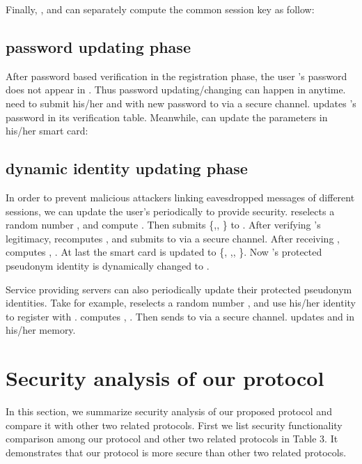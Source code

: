 \documentclass[preprint,12pt]{elsarticle}
\begin{document}
Finally, ,  and  can separately compute the common session key  as follow:


\subsection{password updating phase}
After password based verification in the registration phase, the user 's password   does not appear in . Thus password updating/changing can happen in anytime.  need to submit his/her  and  with new password  to  via a secure channel.  updates 's password in its verification table. Meanwhile,  can update the parameters in his/her smart card:


\subsection{dynamic identity updating phase}
In order to prevent malicious attackers linking eavesdropped messages of different sessions, we can update the user's  periodically to provide security.  reselects a random number , and compute . Then  submits \{,, \} to . After verifying 's legitimacy,  recomputes ,  and submits  to  via a secure channel. After receiving ,  computes , . At last the smart card is updated to \{, ,, \}. Now 's protected pseudonym identity  is dynamically changed to .

Service providing servers can also periodically update their protected pseudonym identities. Take  for example,  reselects a random number , and use his/her identity  to register with .  computes , . Then  sends  to  via a secure channel.  updates  and  in his/her memory.

\section{Security analysis of our protocol}
In this section, we summarize security analysis of our proposed protocol and compare it with other two related protocols. First we list security functionality comparison among our protocol and other two related protocols in Table 3. It demonstrates that our protocol is more secure than other two related protocols.
\end{document}

